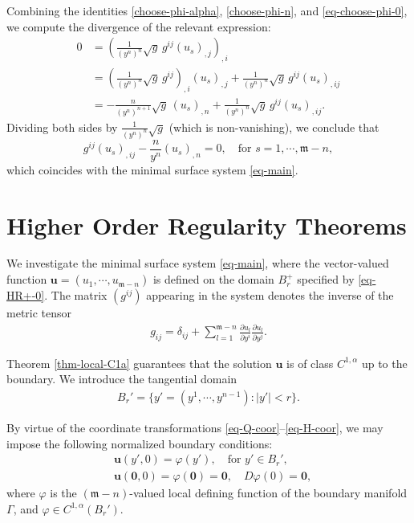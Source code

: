 \documentclass[11pt,reqno]{amsart}
\newcommand{\fm}{\mathfrak{m}}
\theoremstyle{definition}
\numberwithin{equation}{section}
\begin{document}
Combining the identities \eqref{choose-phi-alpha}, \eqref{choose-phi-n}, and \eqref{eq-choose-phi-0}, we compute the divergence of the relevant expression:
\begin{equation}\label{choose-eta}
    \begin{aligned}
   0&=\left(\frac{1}{(y^n)^n}\sqrt{g}\,g^{ij}(u_s)_{,j}\right)_{,i} \\
   &=\left(\frac{1}{(y^n)^n}\sqrt{g}\,g^{ij}\right)_{,i}(u_s)_{,j}+\frac{1}{(y^n)^n}\sqrt{g}\,g^{ij}(u_s)_{,ij}\\
   &=-\frac{n}{(y^n)^{n+1}}\sqrt{g}\,(u_s)_{,n}+\frac{1}{(y^n)^n}\sqrt{g}\,g^{ij}(u_s)_{,ij}.
   \end{aligned}
\end{equation}
Dividing both sides by $\frac{1}{(y^n)^n}\sqrt{g}$ (which is non-vanishing), we conclude that
\begin{equation}\label{main-equation}
    g^{ij}(u_s)_{,ij}-\frac{n}{y^n}(u_s)_{,n}=0,\quad\text{for }s=1,\cdots,\fm -n,
\end{equation}
which coincides with the minimal surface system \eqref{eq-main}.

\section{Higher Order Regularity Theorems}\label{sec-HR}
We investigate the minimal surface system \eqref{eq-main}, where the vector-valued function $\mathbf{u}= (u_1, \cdots, u_{\fm-n})$ is defined on the domain $B^+_r$ specified by \eqref{eq-HR+-0}. The matrix $(g^{ij})$ appearing in the system denotes the inverse of the metric tensor
\begin{align}
    g_{ij} = \delta_{ij} +\sum_{l=1}^{\fm -n} \frac{\partial u_l}{\partial y^i}\frac{\partial u_l}{\partial y^j}.
\end{align}

Theorem \ref{thm-local-C1a} guarantees that the solution $\mathbf{u}$ is of class $C^{1,\alpha}$ up to the boundary. We introduce the tangential domain
\begin{align}
    B_r' = \{y' =(y^1,\cdots, y^{n-1}): |y'| <r\}.
\end{align}

By virtue of the coordinate transformations \eqref{eq-Q-coor}--\eqref{eq-H-coor}, we may impose the following normalized boundary conditions:
\begin{align}\label{eq-varphi-0}
    &\mathbf{u} (y', 0) = \varphi(y'), \quad \text{for } y'\in B_r',\\
    &\mathbf{u} (\mathbf{0}, 0) = \varphi(\mathbf{0}) = \mathbf{0},\quad D\varphi ({0}) = \mathbf{0},\label{eq-varphi-01}
\end{align}
where $\varphi$ is the $(\fm-n)$-valued local defining function of the boundary manifold $\Gamma$, and $\varphi\in C^{1,\alpha}(B_r')$.
\end{document}
